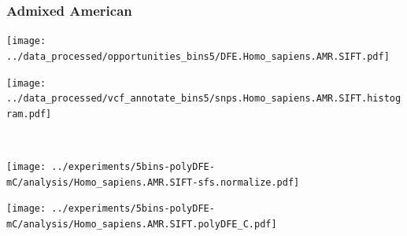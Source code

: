 \subsubsection{Admixed American}

\begin{minipage}{0.49\linewidth}
    \texttt{[image: ../data\_processed/opportunities\_bins5/DFE.Homo\_sapiens.AMR.SIFT.pdf]}
\end{minipage}
\begin{minipage}{0.49\linewidth}
    \texttt{[image: ../data\_processed/vcf\_annotate\_bins5/snps.Homo\_sapiens.AMR.SIFT.histogram.pdf]}
\end{minipage}
\\
\begin{minipage}{0.49\linewidth}
    \texttt{[image: ../experiments/5bins-polyDFE-mC/analysis/Homo\_sapiens.AMR.SIFT-sfs.normalize.pdf]}
\end{minipage}
\begin{minipage}{0.4\linewidth}
    \texttt{[image: ../experiments/5bins-polyDFE-mC/analysis/Homo\_sapiens.AMR.SIFT.polyDFE\_C.pdf]}
\end{minipage}
